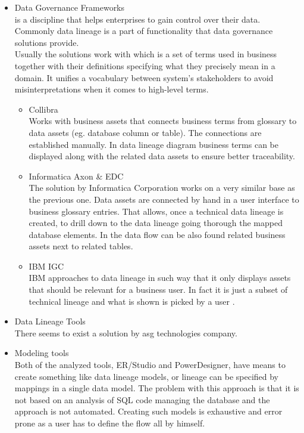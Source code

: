 \begin{itemize}
	\item Data Governance Frameworks \\ 
	 is a discipline that helps enterprises to gain control over their data. Commonly data lineage is a part of functionality that data governance solutions provide. \\
	Usually the solutions work with  which is a set of terms used in business together with their definitions specifying what they precisely mean in a domain. It unifies a vocabulary between system's stakeholders to avoid misinterpretations when it comes to high-level terms. 
	\begin{itemize}
		\item Collibra \\ 
		Works with business assets that connects business terms from glossary to data assets (eg. database column or table). The connections are established manually\cite{CollibraBusinessAssets}. In data lineage diagram business terms can be displayed along with the related data assets to ensure better traceability\cite{CollibraVisualization}.
		\item Informatica Axon \& EDC \\ 
		The solution by Informatica Corporation works on a very similar base as the previous one.
		Data assets are connected by hand in a user interface to business glossary entries\cite{InformaticaBusinessAssets}. That allows, once a technical data lineage is created, to drill down to the data lineage going thorough the mapped database elements. In the data flow can be also found related business assets next to related tables.
		\item IBM IGC \\ 
		IBM approaches to data lineage in such way that it only displays assets that should be relevant for a business user. In fact it is just a subset of technical lineage and what is shown is picked by a user \cite{IbmIgcBusinessLineage}.
	\end{itemize}
	\item Data Lineage Tools \\ 
		There seems to exist a solution by asg technologies company. 
	
	\item Modeling tools \\
	Both of the analyzed tools, ER/Studio and PowerDesigner, have means to create something like data lineage models, or lineage can be specified by mappings in a single data model. The problem with this approach is that it is not based on an analysis of SQL code managing the database and the approach is not automated. Creating such models is exhaustive and error prone as a user has to define the flow all by himself. 
\end{itemize}


